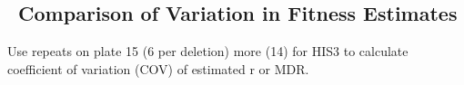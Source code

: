 \begin{multicols}{2}

\subsection{\thesubsection~Comparison of Variation in Fitness Estimates}

Use repeats on plate 15 (6 per deletion) more (14) for HIS3 to
calculate coefficient of variation (COV) of estimated r or MDR.

\end{multicols}
\graphicspath{{images/COV/}}
